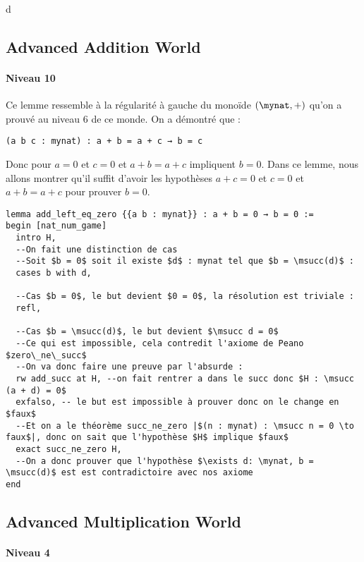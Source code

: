d\subsection{Advanced Addition World}

\paragraph{Niveau 10}

Ce lemme ressemble à la régularité à gauche du monoïde $(\mynat, +)$ qu'on a prouvé au niveau 6 de ce monde.
On a démontré que :
\begin{verbatim}
(a b c : mynat) : a + b = a + c → b = c
\end{verbatim}
Donc pour $a = 0$ et $c = 0$ et $a + b = a + c$ impliquent $b = 0$.
Dans ce lemme, nous allons montrer qu'il suffit d'avoir les hypothèses $a+c = 0$ et $c = 0$ et $a + b = a + c$ pour prouver $b = 0$.

\begin{verbatim}
lemma add_left_eq_zero {{a b : mynat}} : a + b = 0 → b = 0 :=
begin [nat_num_game]
  intro H,
  --On fait une distinction de cas
  --Soit $b = 0$ soit il existe $d$ : mynat tel que $b = \msucc(d)$ :
  cases b with d,

  --Cas $b = 0$, le but devient $0 = 0$, la résolution est triviale :
  refl,

  --Cas $b = \msucc(d)$, le but devient $\msucc d = 0$
  --Ce qui est impossible, cela contredit l'axiome de Peano $zero\_ne\_succ$
  --On va donc faire une preuve par l'absurde :
  rw add_succ at H, --on fait rentrer a dans le succ donc $H : \msucc (a + d) = 0$
  exfalso, -- le but est impossible à prouver donc on le change en $faux$
  --Et on a le théorème succ_ne_zero |$(n : mynat) : \msucc n = 0 \to faux$|, donc on sait que l'hypothèse $H$ implique $faux$
  exact succ_ne_zero H,
  --On a donc prouver que l'hypothèse $\exists d: \mynat, b = \msucc(d)$ est est contradictoire avec nos axiome
end
\end{verbatim}

\subsection{Advanced Multiplication World}

\paragraph{Niveau 4}

